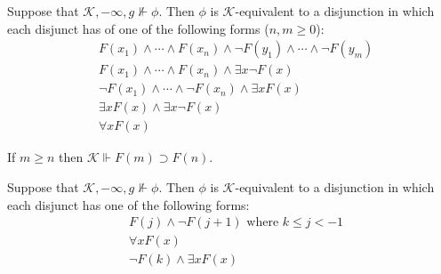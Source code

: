 \documentclass[10pt,a4paper]{amsart}
\newcommand{\then}{\mathbin{\supset}}
\begin{document}
\begin{claim}\label{into-dnf}
    Suppose that $\mathcal{K},-\infty,g \nVdash \phi$. Then $\phi$ is $\mathcal{K}$-equivalent to a disjunction in which each disjunct has of one of the following forms ($n,m \geq 0$):
    \begin{align*}
        & F(x_1) \wedge \cdots \wedge F(x_n) \wedge \neg F(y_1) \wedge \cdots \wedge \neg F(y_m) \\
        & F(x_1) \wedge \cdots \wedge F(x_n) \wedge \exists x \neg F(x) \\
        & \neg F(x_1) \wedge \cdots \wedge \neg F(x_n) \wedge \exists x F(x) \\
        & \exists x F(x) \wedge \exists x \neg F(x) \\
        & \forall x F(x)
    \end{align*}
\end{claim}

\begin{claim}\label{observation}
    If $m\geq n$ then $\mathcal{K} \Vdash F(m)\then F(n)$.
\end{claim}

\begin{claim}\label{boundary}
    Suppose that $\mathcal{K},-\infty,g \nVdash \phi$. Then $\phi$ is $\mathcal{K}$-equivalent to a disjunction in which each disjunct has one of the following forms:
    \begin{align*}
        & F(j) \wedge \neg F(j+1) \text{ where } k \leq j <-1 \\
        & \forall x F(x) \\
        & \neg F(k) \wedge \exists x F(x)
    \end{align*}
\end{claim}
\end{document}
